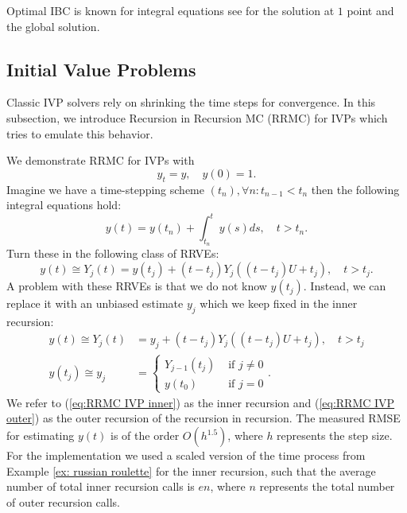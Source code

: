 \documentclass[a4paper,12pt]{article}
\begin{document}
\begin{related}
  Optimal IBC is known for integral equations see \cite{heinrich_monte_1998}
  for the solution at $1$ point and the global solution.
\end{related}

\subsection{Initial Value Problems}
Classic IVP solvers rely on shrinking the time steps for
convergence. In this subsection, we introduce
Recursion in Recursion MC (RRMC) for IVPs which tries to emulate
this behavior.


\begin{example}[RRMC $y_t=y$] \label{ex:RRMC IVP}
  We demonstrate RRMC for IVPs with
  \begin{equation}
    y_t = y, \quad y(0) = 1.
  \end{equation}
  Imagine we have a time-stepping scheme $(t_{n}), \forall n: t_{n-1} < t_{n}$
  then the following integral equations hold:
  \begin{equation}
    y(t)= y(t_{n}) + \int_{t_{n}}^{t}y(s)ds , \quad t>t_{n}.
  \end{equation}
  Turn these in the following class of RRVEs:
  \begin{equation}
    y(t) \cong Y_{j}(t) = y(t_{j}) + (t-t_{j})Y_{j}((t-t_{j})U+t_{j}), \quad t>t_{j}.
  \end{equation}
  A problem with these RRVEs is that we do not know $y(t_{j})$.
  Instead, we can replace it with an unbiased estimate $y_{j}$
  which we keep fixed in the inner recursion:
  \begin{align}
    \label{eq:RRMC IVP inner}
    y(t) \cong Y_{j}(t)  & = y_{j} + (t-t_{j})Y_{j}((t-t_{j})U+t_{j}), \quad t>t_{j} \\
    y(t_{j}) \cong y_{j} & = \begin{cases}
                               Y_{j-1}(t_{j}) & \text{ if } j \neq 0 \\
                               y(t_{0})       & \text{ if } j = 0
                             \end{cases}.
    \label{eq:RRMC IVP outer}
  \end{align}
  We refer to (\ref{eq:RRMC IVP inner}) as the inner recursion and
  (\ref{eq:RRMC IVP outer}) as the outer recursion of the recursion in
  recursion.
  The measured RMSE for estimating $y(t)$ is of the order
  $O\left(h^{1.5} \right)$, where $h$ represents
  the step size. For the implementation we used a scaled version
  of the time process from Example \ref{ex: russian roulette}
  for the inner recursion, such that the average number of total inner recursion calls
  is $e n$, where $n$ represents the total number of outer recursion calls.
\end{example}
\end{document}
